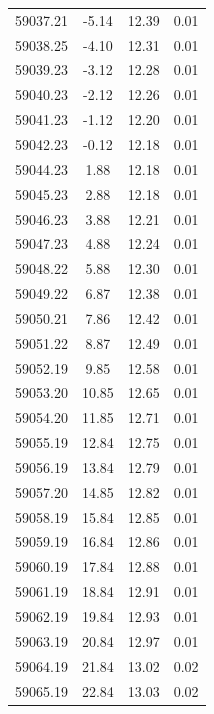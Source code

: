 \begin{longtable}{|c|c|c|c|}
 59037.21 &   -5.14 &       12.39 &          0.01 \\
 59038.25 &   -4.10 &       12.31 &          0.01 \\
 59039.23 &   -3.12 &       12.28 &          0.01 \\
 59040.23 &   -2.12 &       12.26 &          0.01 \\
 59041.23 &   -1.12 &       12.20 &          0.01 \\
 59042.23 &   -0.12 &       12.18 &          0.01 \\
 59044.23 &    1.88 &       12.18 &          0.01 \\
 59045.23 &    2.88 &       12.18 &          0.01 \\
 59046.23 &    3.88 &       12.21 &          0.01 \\
 59047.23 &    4.88 &       12.24 &          0.01 \\
 59048.22 &    5.88 &       12.30 &          0.01 \\
 59049.22 &    6.87 &       12.38 &          0.01 \\
 59050.21 &    7.86 &       12.42 &          0.01 \\
 59051.22 &    8.87 &       12.49 &          0.01 \\
 59052.19 &    9.85 &       12.58 &          0.01 \\
 59053.20 &   10.85 &       12.65 &          0.01 \\
 59054.20 &   11.85 &       12.71 &          0.01 \\
 59055.19 &   12.84 &       12.75 &          0.01 \\
 59056.19 &   13.84 &       12.79 &          0.01 \\
 59057.20 &   14.85 &       12.82 &          0.01 \\
 59058.19 &   15.84 &       12.85 &          0.01 \\
 59059.19 &   16.84 &       12.86 &          0.01 \\
 59060.19 &   17.84 &       12.88 &          0.01 \\
 59061.19 &   18.84 &       12.91 &          0.01 \\
 59062.19 &   19.84 &       12.93 &          0.01 \\
 59063.19 &   20.84 &       12.97 &          0.01 \\
 59064.19 &   21.84 &       13.02 &          0.02 \\
 59065.19 &   22.84 &       13.03 &          0.02 \\

\end{longtable}
